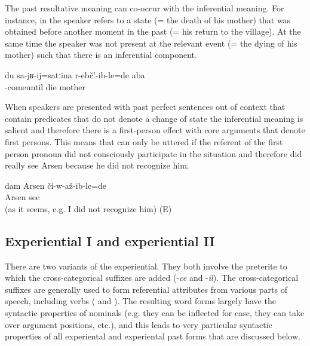 The past resultative meaning can co-occur with the inferential meaning. For instance, in  the speaker refers to a state (= the death of his mother) that was obtained before another moment in the past (= his return to the village). At the same time the speaker was not present at the relevant event (= the dying of his mother) such that there is an inferential component.
%
\begin{exe}
	\ex	\label{ex:Before/until I came (home) my mother had already died}
	\gll	du	sa-jʁ-ij=satːina 	r-ebč'-ib-le=de	aba\\
			-comeuntil	die	mother\\
	\glt	{}
\end{exe}

When speakers are presented with past perfect sentences out of context that contain predicates that do not denote a change of state the inferential meaning is salient and therefore there is a first-person effect with core arguments that denote first persons. This means that  can only be uttered if the referent of the first person pronoun did not consciously participate in the situation and therefore did really see Arsen because he did not recognize him.
%
\begin{exe}
	\ex	\label{ex:I saw Arsen. (as it seems, and e.g. I did not recognize him)}
	\gll	dam	Arsen	či-w-až-ib-le=de\\
			Arsen	see\\
	\glt	{} (as it seems, e.g. I did not recognize him) (E)
\end{exe}



\subsection{Experiential I and experiential II}
\label{ssec:Experiential I and experiential II}

There are two variants of the experiential. They both involve the preterite to which the cross-categorical suffixes are added (-\textit{ce} and -\textit{il}). The cross-categorical suffixes are generally used to form referential attributes from various parts of speech, including verbs ( and ). The resulting word forms largely have the syntactic properties of nominals (e.g. they can be inflected for case, they can take over argument positions, etc.), and this leads to very particular syntactic properties of all experiental and experiental past forms that are discussed below.

